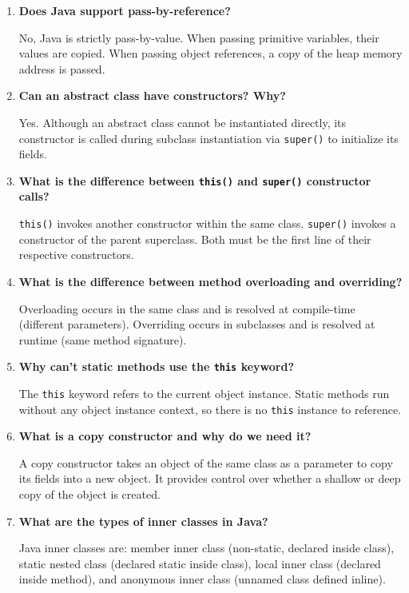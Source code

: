 \documentclass[12pt,a4paper]{article}
\newcommand{\Q}[1]{\textbf{#1}\par\noindent\ignorespaces}
\begin{document}
\begin{tcolorbox}[exambox, title={\textbf{Frequently Asked / Viva Questions}}]
\begin{enumerate}[leftmargin=*, label=\textbf{Q\arabic*.}, itemsep=5pt]
  \item \Q{Does Java support pass-by-reference?}
        No, Java is strictly pass-by-value. When passing primitive variables, their values are copied. When passing object references, a copy of the heap memory address is passed.
        
  \item \Q{Can an abstract class have constructors? Why?}
        Yes. Although an abstract class cannot be instantiated directly, its constructor is called during subclass instantiation via \texttt{super()} to initialize its fields.
        
  \item \Q{What is the difference between \texttt{this()} and \texttt{super()} constructor calls?}
        \texttt{this()} invokes another constructor within the same class. \texttt{super()} invokes a constructor of the parent superclass. Both must be the first line of their respective constructors.
        
  \item \Q{What is the difference between method overloading and overriding?}
        Overloading occurs in the same class and is resolved at compile-time (different parameters). Overriding occurs in subclasses and is resolved at runtime (same method signature).
        
  \item \Q{Why can't static methods use the \texttt{this} keyword?}
        The \texttt{this} keyword refers to the current object instance. Static methods run without any object instance context, so there is no \texttt{this} instance to reference.
        
  \item \Q{What is a copy constructor and why do we need it?}
        A copy constructor takes an object of the same class as a parameter to copy its fields into a new object. It provides control over whether a shallow or deep copy of the object is created.
        
  \item \Q{What are the types of inner classes in Java?}
        Java inner classes are: member inner class (non-static, declared inside class), static nested class (declared static inside class), local inner class (declared inside method), and anonymous inner class (unnamed class defined inline).
        

\end{enumerate}
\end{tcolorbox}
\end{document}
